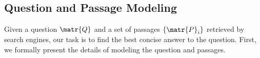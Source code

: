 
\subsection{Question and Passage Modeling}
\label{modeling}

Given a question $\matr{Q}$ and a set of passages 
$\{\matr{P}_i\}$  retrieved by search engines, 
our task is to find the best concise answer to the question. First, we formally present the details of modeling the question and passages.

